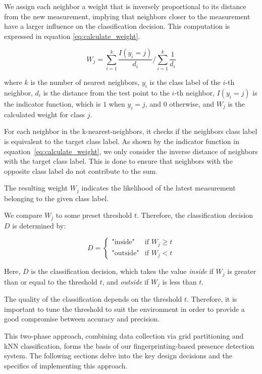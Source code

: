 We assign each neighbor a weight that is inversely proportional to its distance from the new measurement, implying that neighbors closer to the measurement have a larger influence on the classification decision.
This computation is expressed in equation \ref{eq:calculate_weight}.

\begin{equation}\label{eq:calculate_weight}
W_j = \sum_{i=1}^{k} \frac{I(y_i = j)}{d_i} \Bigg/ \sum_{i=1}^{k} \frac{1}{d_i}
\end{equation}

where $k$ is the number of nearest neighbors, $y_i$ is the class label of the $i$-th neighbor, $d_i$ is the distance from the test point to the $i$-th neighbor, $I(y_i=j)$ is the indicator function, which is $1$ when $y_i=j$, and $0$ otherwise, and $W_j$ is the calculated weight for class $j$.

For each neighbor in the k-nearest-neighbors, it checks if the neighbors class label is equivalent to the target class label. As shown by the indicator function in equation~\ref{eq:calculate_weight}, we only consider the inverse distance of neighbors with the target class label. This is done to ensure that neighbors with the opposite class label do not contribute to the sum.

The resulting weight $W_j$ indicates the likelihood of the latest measurement belonging to the given class label.

We compare $W_j$ to some preset threshold $t$. Therefore, the classification decision $D$ is determined by:

$$
D = 
\begin{cases}
\text{"inside"} & \text{if } W_j \geq t \\
\text{"outside"} & \text{if } W_j < t 
\end{cases}
$$

Here, $D$ is the classification decision, which takes the value \textit{inside} if $W_j$ is greater than or equal to the threshold $t$, and \textit{outside} if $W_j$ is less than $t$.

The quality of the classification depends on the threshold $t$.
Therefore, it is important to tune the threshold to suit the environment in order to provide a good compromise between accuracy and precision.

This two-phase approach, combining data collection via grid partitioning and kNN classification, forms the basis of our fingerprinting-based presence detection system.
The following sections delve into the key design decisions and the specifics of implementing this approach.